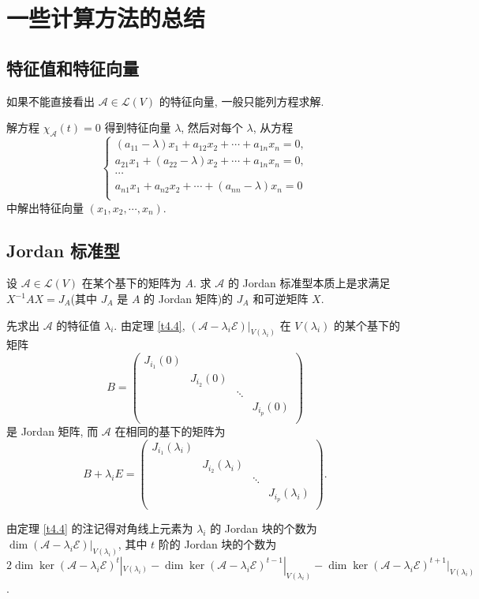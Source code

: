 \documentclass[color=black,device=normal,lang=cn,mode=geye]{elegantnote}
\begin{document}
\section{一些计算方法的总结}
\subsection{特征值和特征向量}
如果不能直接看出 $\mathcal{A}\in\mathcal{L}(V)$ 的特征向量, 一般只能列方程求解.

解方程 $\chi_\mathcal{A}(t)=0$ 得到特征向量 $\lambda$, 然后对每个 $\lambda$, 从方程
\[\begin{cases}
    (a_{11}-\lambda)x_1+a_{12}x_2+\cdots+a_{1n}x_n=0, \\
    a_{21}x_1+(a_{22}-\lambda)x_2+\cdots+a_{1n}x_n=0, \\
    \cdots \\
    a_{n1}x_1+a_{n2}x_2+\cdots+(a_{nn}-\lambda)x_n=0 \\
\end{cases}\]
中解出特征向量 $(x_1,x_2,\cdots,x_n)$.
\subsection{Jordan 标准型}
设 $\mathcal{A}\in\mathcal{L}(V)$ 在某个基下的矩阵为 $A$. 求 $\mathcal{A}$ 的 Jordan 标准型本质上是求满足 $X^{-1}AX=J_A$(其中 $J_A$ 是 $A$ 的 Jordan 矩阵)的 $J_A$ 和可逆矩阵 $X$.

先求出 $\mathcal{A}$ 的特征值 $\lambda_i$. 由定理 \ref{t4.4}, $(\mathcal{A}-\lambda_i\mathcal{E})|_{V(\lambda_i)}$ 在 $V(\lambda_i)$ 的某个基下的矩阵
\[B=\begin{pmatrix}
    J_{i_1}(0) \\
    & J_{i_2}(0) \\
    && \ddots \\
    &&& J_{i_p}(0) \\
\end{pmatrix}\]
是 Jordan 矩阵, 而 $\mathcal{A}$ 在相同的基下的矩阵为
\[B+\lambda_iE=\begin{pmatrix}
    J_{i_1}(\lambda_i) \\
    & J_{i_2}(\lambda_i) \\
    && \ddots \\
    &&& J_{i_p}(\lambda_i) \\
\end{pmatrix}.\]

由定理 \ref{t4.4} 的注记得对角线上元素为 $\lambda_i$ 的 Jordan 块的个数为 $\dim(\mathcal{A}-\lambda_i\mathcal{E})|_{V(\lambda_i)}$, 其中 $t$ 阶的 Jordan 块的个数为 $2\dim\ker(\mathcal{A}-\lambda_i\mathcal{E})^t|_{V(\lambda_i)}-\dim\ker(\mathcal{A}-\lambda_i\mathcal{E})^{t-1}|_{V(\lambda_i)}-\dim\ker(\mathcal{A}-\lambda_i\mathcal{E})^{t+1}|_{V(\lambda_i)}$.
\end{document}

